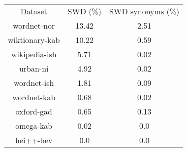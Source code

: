 \begin{tabular}{ccc}
    Dataset        & SWD (\%) & SWD synonyms (\%) \\
    wordnet-nor    & 13.42    & 2.51              \\
    wiktionary-kab & 10.22    & 0.59              \\
    wikipedia-ish  & 5.71     & 0.02              \\
    urban-ni       & 4.92     & 0.02              \\
    wordnet-ish    & 1.81     & 0.09              \\
    wordnet-kab    & 0.68     & 0.02              \\
    oxford-gad     & 0.65     & 0.13              \\
    omega-kab      & 0.02     & 0.0               \\
    hei++-bev      & 0.0      & 0.0               \\
\end{tabular}
